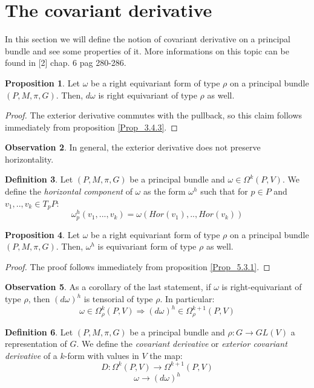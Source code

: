 \documentclass[12pt,a4paper]{report}
\theoremstyle{definition}
\newtheorem{Def}{Definition}[chapter]
\theoremstyle{Theorem}
\newtheorem{Prop}[Def]{Proposition}
\theoremstyle{definition}
\theoremstyle{definition}
\newtheorem{Obs}[Def]{Observation}
\begin{document}
	\section{The covariant derivative}
	In this section we will define the notion of covariant derivative on a principal bundle and see some properties of it. More informations on this topic can be found in [2] chap. 6 pag 280-286.
	\begin{Prop}
		Let $\omega$ be a right equivariant form of type $\rho$ on a principal bundle $(P,M,\pi,G)$. Then, $d\omega$ is right equivariant of type $\rho$ as well.
	\end{Prop}
	\begin{proof}
		The exterior derivative commutes with the pullback, so this claim follows immediately from proposition \ref{Prop_3.4.3}.
	\end{proof}
	\begin{Obs}
		In general, the exterior derivative does not preserve horizontality.
	\end{Obs}
	\begin{Def}
		Let $(P,M,\pi,G)$ be a principal bundle and $\omega\in \Omega^k(P,V)$. We define the \textit{horizontal component} of $\omega$ as the form $\omega^h$ such that for $p\in P$ and $v_1,..,v_k\in T_pP$:
		$$\omega^h_p(v_1,...,v_k)=\omega(Hor(v_1),..,Hor(v_k))$$
	\end{Def}
	\begin{Prop}
		Let $\omega$ be a right equivariant form of type $\rho$ on a principal bundle $(P,M,\pi,G)$. Then, $\omega^h$ is equivariant form of type $\rho$ as well.
	\end{Prop}
	\begin{proof}
		The proof follows immediately from proposition \ref{Prop_5.3.1}.
	\end{proof}
	\begin{Obs}
		As a corollary of the last statement, if $\omega$ is right-equivariant of type $\rho$, then $(d\omega)^h$ is tensorial of type $\rho$. In particular:
		$$\omega\in \Omega^k_\rho(P,V)\Rightarrow (d\omega)^h\in\Omega^{k+1}_\rho(P,V)$$
	\end{Obs}
	\begin{Def}
		Let $(P,M,\pi,G)$ be a principal bundle and $\rho:G\rightarrow GL(V)$ a representation of $G$. We define the \textit{covariant derivative} or \textit{exterior covariant derivative} of a $k$-form with values in $V$ the map:
		$$D:\Omega^k(P,V)\rightarrow \Omega^{k+1}(P,V)$$
		$$\omega\rightarrow (d\omega)^h$$
	\end{Def}
\end{document}
